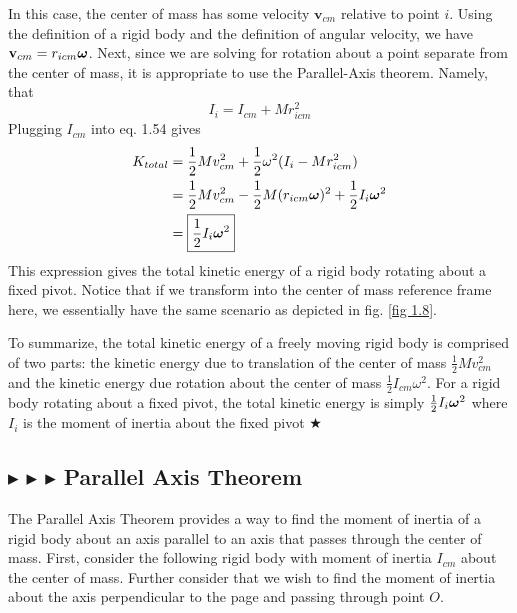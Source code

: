 \noindent In this case, the center of mass has some velocity $\mathbf{v}_{cm}$ relative to point $i$. Using the definition of a rigid body and the definition of angular velocity, we have $\mathbf{v}_{cm} = r_{icm} \boldsymbol{\omega}$. Next, since we are solving for rotation about a point separate from the center of mass, it is appropriate to use the Parallel-Axis theorem. Namely, that
\begin{equation}
    I_i = I_{cm} + Mr_{icm}^2
\end{equation}
\noindent Plugging $I_{cm}$ into eq. 1.54 gives
\begin{align}
    K_{total} &= \frac12 M v_{cm}^2 + \frac12 \omega^2 (I_i - Mr_{icm}^2) \nonumber \\
    &= \frac12 M v_{cm}^2 - \frac12 M (r_{icm} \boldsymbol{\omega})^2 + \frac12 I_i \boldsymbol{\omega}^2 \nonumber \\
    &= \boxed{\frac12 I_i \boldsymbol{\omega}^2}
\end{align}
\noindent This expression gives the total kinetic energy of a rigid body rotating about a fixed pivot. Notice that if we transform into the center of mass reference frame here, we essentially have the same scenario as depicted in fig. \ref{fig 1.8}.

\noindent To summarize, the total kinetic energy of a freely moving rigid body is comprised of two parts: the kinetic energy due to translation of the center of mass $\frac12 M v_{cm}^2$ and the kinetic energy due rotation about the center of mass $\frac12 I_{cm} \omega^2$. For a rigid body rotating about a fixed pivot, the total kinetic energy is simply $\frac12 I_i \boldsymbol{\omega}^2$ where $I_i$ is the moment of inertia about the fixed pivot $\bigstar$

\subsection{\color{PineGreen} $\blacktriangleright$ \color{Goldenrod} $\blacktriangleright$ \color{Orchid} $\blacktriangleright$ \color{black} Parallel Axis Theorem}
The Parallel Axis Theorem provides a way to find the moment of inertia of a rigid body about an axis parallel to an axis that passes through the center of mass. First, consider the following rigid body with moment of inertia $I_{cm}$ about the center of mass. Further consider that we wish to find the moment of inertia about the axis perpendicular to the page and passing through point $O$.

